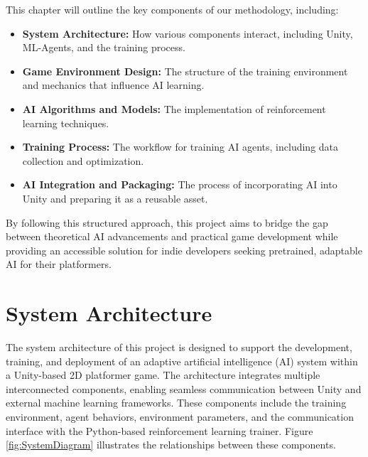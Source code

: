 \documentclass[12pt,oneside,openright,a4paper]{cpe-english-project}
\begin{document}
This chapter will outline the key components of our methodology, including:
\begin{itemize}
\item  \textbf{System Architecture:} How various components interact, including Unity, ML-Agents, and the training process.
\item  \textbf{Game Environment Design:} The structure of the training environment and mechanics that influence AI learning.
\item  \textbf{AI Algorithms and Models:} The implementation of reinforcement learning techniques.
\item  \textbf{Training Process:} The workflow for training AI agents, including data collection and optimization.
\item  \textbf{AI Integration and Packaging:} The process of incorporating AI into Unity and preparing it as a reusable asset.
\end{itemize}

By following this structured approach, this project aims to bridge the gap between theoretical AI advancements and practical game development while providing an accessible solution for indie developers seeking pretrained, adaptable AI for their platformers.\par

\section{System Architecture}

The system architecture of this project is designed to support the development, training, and deployment of an adaptive artificial intelligence (AI) system within a Unity-based 2D platformer game. The architecture integrates multiple interconnected components, enabling seamless communication between Unity and external machine learning frameworks. These components include the training environment, agent behaviors, environment parameters, and the communication interface with the Python-based reinforcement learning trainer. Figure \ref{fig:SystemDiagram} illustrates the relationships between these components.\par
\end{document}
